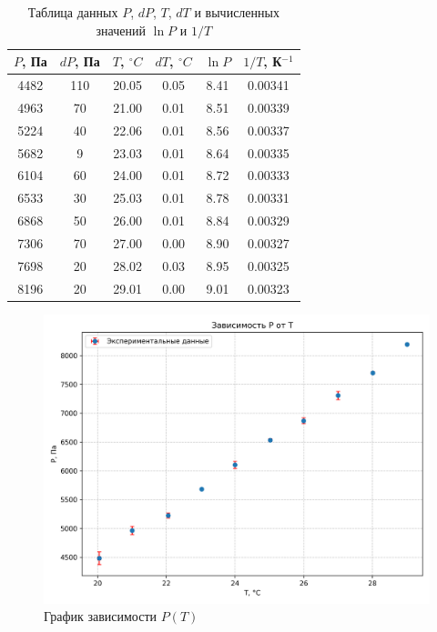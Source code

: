 \documentclass[a4paper,12pt]{article} %
\begin{document}
\begin{table}[h]
    \centering
    \begin{tabular}{|c|c|c|c||c|c|}
        \hline
        $P$, Па & $dP$, Па & $T$, $^\circ C$ & $dT$, $^\circ C$ & $\ln P$ & $1/T$, К$^{-1}$ \\
        \hline
        4482 & 110 & 20.05 & 0.05 & 8.41 & 0.00341 \\
        4963 & 70 & 21.00 & 0.01 & 8.51 & 0.00339 \\
        5224 & 40 & 22.06 & 0.01 & 8.56 & 0.00337 \\
        5682 & 9 & 23.03 & 0.01 & 8.64 & 0.00335 \\
        6104 & 60 & 24.00 & 0.01 & 8.72 & 0.00333 \\
        6533 & 30 & 25.03 & 0.01 & 8.78 & 0.00331 \\
        6868 & 50 & 26.00 & 0.01 & 8.84 & 0.00329 \\
        7306 & 70 & 27.00 & 0.00 & 8.90 & 0.00327 \\
        7698 & 20 & 28.02 & 0.03 & 8.95 & 0.00325 \\
        8196 & 20 & 29.01 & 0.00 & 9.01 & 0.00323 \\
        \hline
    \end{tabular}
    \caption{Таблица данных $P$, $dP$, $T$, $dT$ и вычисленных значений $\ln P$ и $1/T$}
    \label{tab:lnP_1T}
\end{table}

\begin{figure}
    \centering
    \includegraphics[scale = 0.75]{graph1.png}
    \caption{График зависимости $P(T)$}
    \label{fig:graph1}
  \end{figure}
\end{document}
